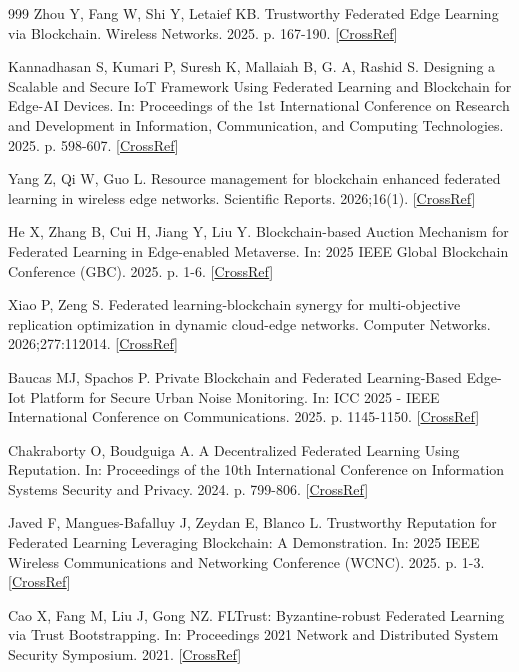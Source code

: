 \documentclass[cmc,article,submit,moreauthors,pdftex]{Definitions/tsp}
\begin{document}
\begin{thebibliography}{999}
Zhou Y, Fang W, Shi Y, Letaief KB. Trustworthy Federated Edge Learning via Blockchain. Wireless Networks. 2025. p. 167-190. [\href{https://doi.org/10.1007/978-3-031-96649-1_9}{CrossRef}]

Kannadhasan S, Kumari P, Suresh K, Mallaiah B, G. A, Rashid S. Designing a Scalable and Secure IoT Framework Using Federated Learning and Blockchain for Edge-AI Devices. In: Proceedings of the 1st International Conference on Research and Development in Information, Communication, and Computing Technologies. 2025. p. 598-607. [\href{https://doi.org/10.5220/0013870100004919}{CrossRef}]

Yang Z, Qi W, Guo L. Resource management for blockchain enhanced federated learning in wireless edge networks. Scientific Reports. 2026;16(1). [\href{https://doi.org/10.1038/s41598-026-56310-1}{CrossRef}]

He X, Zhang B, Cui H, Jiang Y, Liu Y. Blockchain-based Auction Mechanism for Federated Learning in Edge-enabled Metaverse. In: 2025 IEEE Global Blockchain Conference (GBC). 2025. p. 1-6. [\href{https://doi.org/10.1109/gbc60041.2025.11134466}{CrossRef}]

Xiao P, Zeng S. Federated learning-blockchain synergy for multi-objective replication optimization in dynamic cloud-edge networks. Computer Networks. 2026;277:112014. [\href{https://doi.org/10.1016/j.comnet.2026.112014}{CrossRef}]

Baucas MJ, Spachos P. Private Blockchain and Federated Learning-Based Edge-Iot Platform for Secure Urban Noise Monitoring. In: ICC 2025 - IEEE International Conference on Communications. 2025. p. 1145-1150. [\href{https://doi.org/10.1109/icc52391.2025.11160895}{CrossRef}]

Chakraborty O, Boudguiga A. A Decentralized Federated Learning Using Reputation. In: Proceedings of the 10th International Conference on Information Systems Security and Privacy. 2024. p. 799-806. [\href{https://doi.org/10.5220/0012428300003648}{CrossRef}]

Javed F, Mangues-Bafalluy J, Zeydan E, Blanco L. Trustworthy Reputation for Federated Learning Leveraging Blockchain: A Demonstration. In: 2025 IEEE Wireless Communications and Networking Conference (WCNC). 2025. p. 1-3. [\href{https://doi.org/10.1109/wcnc61545.2025.10978588}{CrossRef}]

Cao X, Fang M, Liu J, Gong NZ. FLTrust: Byzantine-robust Federated Learning via Trust Bootstrapping. In: Proceedings 2021 Network and Distributed System Security Symposium. 2021. [\href{https://doi.org/10.14722/ndss.2021.24434}{CrossRef}]


\end{thebibliography}
\end{document}
